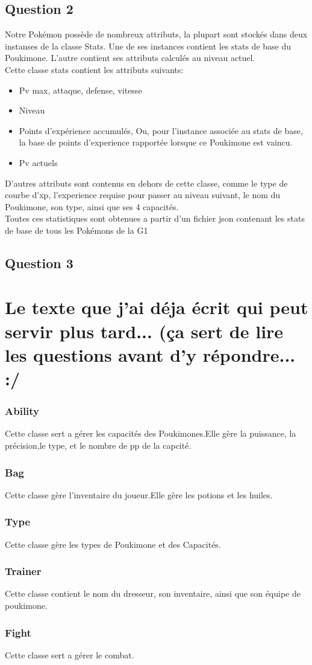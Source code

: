 \documentclass{report}
\begin{document}
\section*{Question 2}
Notre Pokémon possède de nombreux attributs, la plupart sont stockés dans deux instanses de la classe Stats. Une de ses instances contient les stats de base du Poukimone. L'autre contient ses attributs calculés au niveau actuel.
\\Cette classe stats contient les attributs suivants:
\begin{itemize}
    \item{Pv max, attaque, defense, vitesse}
    \item{Niveau}
    \item{Points d'expérience accumulés, Ou, pour l'instance associée au stats de base, la base de points d'experience rapportée lorsque ce Poukimone est vaincu.}
    \item{Pv actuels}
\end{itemize}
D'autres attributs sont contenus en dehors de cette classe, comme le type de courbe d'xp, l'experience requise pour passer au niveau suivant, le nom du Poukimone, son type, ainsi que ses 4 capacités.
\\ Toutes ces statistiques sont obtenues a partir d'un fichier json contenant les stats de base de tous les Pokémons de la G1
\section*{Question 3}

\chapter*{Le texte que j'ai déja écrit qui peut servir plus tard... (ça sert de lire les questions avant d'y répondre... :/}
\subsection*{Ability}
Cette classe sert a gérer les capacités des Poukimones.Elle gère la puissance, la précision,le type, et le nombre de pp de la capcité.
\subsection*{Bag}
Cette classe gère l'inventaire du joueur.Elle gère les potions et les huiles.
\subsection*{Type}
Cette classe gère les types de Poukimone et des Capacités.
\subsection*{Trainer}
Cette classe contient le nom du dresseur, son inventaire, ainsi que son équipe de poukimone.
\subsection*{Fight}
Cette classe sert a gérer le combat.\\
\end{document}
